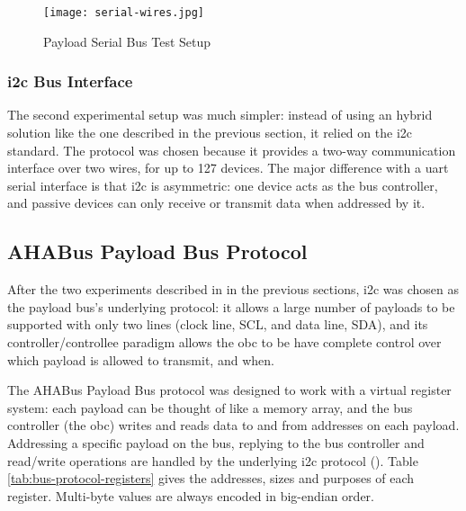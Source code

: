 \begin{figure}[H]
\texttt{[image: serial-wires.jpg]}
\centering
\caption{Payload Serial Bus Test Setup}
\label{fig:uart-nor}
\end{figure}

\subsubsection{\acrshort{i2c} Bus Interface}


The second experimental setup was much simpler: instead of using an hybrid
solution like the one described in the previous section, it relied on the
\acrshort{i2c} standard. The protocol was chosen because it provides a two-way
communication interface over two wires, for up to 127 devices. The major
difference with a \acrshort{uart} serial interface is that \acrshort{i2c} is
asymmetric: one device acts as the bus controller, and passive devices can
only receive or transmit data when addressed by it.

\subsection{AHABus Payload Bus Protocol}

After the two experiments described in in the previous sections, \acrshort{i2c}
was chosen as the payload bus's underlying protocol: it allows a large number of
payloads to be supported with only two lines (clock line, SCL, and data line,
SDA), and its controller/controllee paradigm allows the \acrshort{obc} to be
have complete control over which payload is allowed to transmit, and when.

The AHABus Payload Bus protocol was designed to work with a virtual register
system: each payload can be thought of like a memory array, and the bus
controller (the \acrshort{obc}) writes and reads data to and from addresses on
each payload. Addressing a specific payload on the bus, replying to the bus
controller and read/write operations are handled by the underlying
\acrshort{i2c} protocol (\cite{NXPSemiconductors2014}). Table
\ref{tab:bus-protocol-registers} gives the addresses, sizes and purposes of
each register. Multi-byte values are always encoded in big-endian order.

